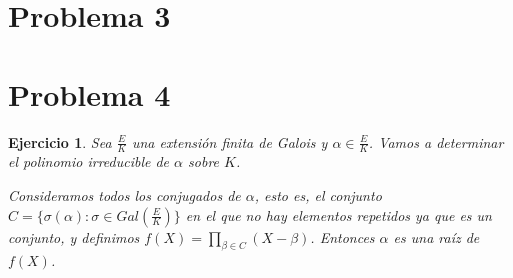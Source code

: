 \documentclass{article}
\theoremstyle{theorem-style}  %
\theoremstyle{definition-style}
\theoremstyle{example-style}
\newtheorem{exercise}{Ejercicio}[section]
\begin{document}
\makeatletter\renewcommand{\ALG@name}{Algoritmo}

\maketitle




%
%
\section{Problema 3}

\section{Problema 4}

\begin{exercise}
Sea $\frac{E}{K}$ una extensión finita de Galois y $\alpha \in \frac{E}{K}$. Vamos a determinar el polinomio irreducible de $\alpha$ sobre $K$. 

Consideramos todos los conjugados de $\alpha$, esto es, el conjunto $C = \{\sigma(\alpha):\sigma \in Gal(\frac{E}{K}) \}$ en el que no hay elementos repetidos ya que es un conjunto, y definimos $f(X) = \prod_{\beta \in C} (X - \beta)$. Entonces $\alpha$ es una raíz de $f(X)$. 

\end{exercise}
\end{document}
